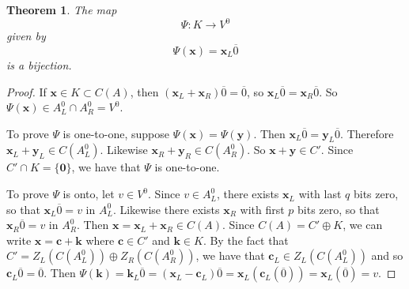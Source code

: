 \documentclass[12pt,twoside,singlespace]{article}
\numberwithin{equation}{section}
\newtheorem{thm}[equation]{Theorem}
\theoremstyle{definition}
\renewcommand{\vec}[1]{\mathbf{#1}}
\begin{document}
\begin{thm}
\label{thm:kv0}
The map
\[\Psi:K\to V^0\]
given by
\[\Psi(\vec{x})=\vec{x}_L\overline{0}\]
is a bijection.
\end{thm}
\begin{proof}
If $\vec{x}\in K\subset C(A)$, then $(\vec{x}_L+\vec{x}_R)\overline{0}=\overline{0}$, so $\vec{x}_L\overline{0}=\vec{x}_R\overline{0}$.  So $\Psi(\vec{x})\in A_L^0\cap A_R^0=V^0$.

To prove $\Psi$ is one-to-one, suppose $\Psi(\vec{x})=\Psi(\vec{y})$.  Then $\vec{x}_L\overline{0}=\vec{y}_L\overline{0}$.  Therefore $\vec{x}_L+\vec{y}_L\in C(A_L^0)$.  Likewise $\vec{x}_R+\vec{y}_R\in C(A_R^0)$.  So $\vec{x}+\vec{y}\in C'$.  Since $C'\cap K=\{\vec{0}\}$, we have that $\Psi$ is one-to-one.

To prove $\Psi$ is onto, let $v\in V^0$.  Since $v\in A_L^0$, there exists $\vec{x}_L$ with last $q$ bits zero, so that $\vec{x}_L\overline{0}=v$ in $A_L^0$.  Likewise there exists $\vec{x}_R$ with first $p$ bits zero, so that $\vec{x}_R\overline{0}=v$ in $A_R^0$.  Then $\vec{x}=\vec{x}_L+\vec{x}_R\in C(A)$.  Since $C(A)=C'\oplus K$, we can write $\vec{x}=\vec{c}+\vec{k}$ where $\vec{c}\in C'$ and $\vec{k}\in K$.  By the fact that $C'=Z_L(C(A_L^0))\oplus Z_R(C(A_R^0))$, we have that $\vec{c}_L\in Z_L(C(A_L^0))$ and so $\vec{c}_L\overline{0}=\overline{0}$.  Then
$\Psi(\vec{k})=\vec{k}_L\overline{0}
=(\vec{x}_L-\vec{c}_L)\overline{0}
=\vec{x}_L(\vec{c}_L(\overline{0}))
=\vec{x}_L(\overline{0})
=v.$
\end{proof}
\end{document}
